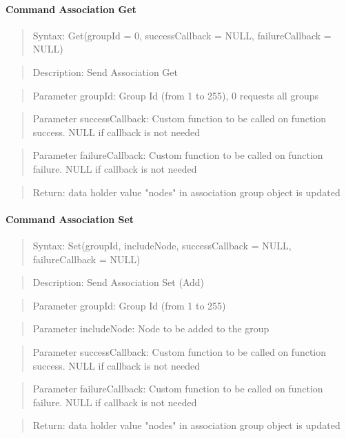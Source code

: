 \paragraph {Command Association Get}
\begin{quote} Syntax: Get(groupId = 0, successCallback = NULL, failureCallback = NULL)\end{quote}
\begin{quote} Description: Send Association Get\end{quote}
\begin{quote} Parameter groupId: Group Id (from 1 to 255), 0 requests all groups\end{quote}
\begin{quote} Parameter successCallback: Custom function to be called on function success. NULL if callback is not needed\end{quote}
\begin{quote} Parameter failureCallback: Custom function to be called on function failure. NULL if callback is not needed\end{quote}
\begin{quote} Return: data holder value "nodes" in association group object is  updated \end{quote}


\paragraph {Command Association Set}
\begin{quote} Syntax: Set(groupId, includeNode, successCallback = NULL, failureCallback = NULL)\end{quote}
\begin{quote} Description: Send Association Set (Add)\end{quote}
\begin{quote} Parameter groupId: Group Id (from 1 to 255)\end{quote}
\begin{quote} Parameter includeNode: Node to be added to the group\end{quote}
\begin{quote} Parameter successCallback: Custom function to be called on function success. NULL if callback is not needed\end{quote}
\begin{quote} Parameter failureCallback: Custom function to be called on function failure. NULL if callback is not needed\end{quote}
\begin{quote} Return: data holder value "nodes" in association group object is  updated \end{quote}


